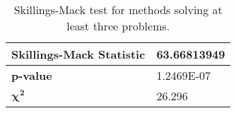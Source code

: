 \begin{table}[h]
\begin{center}
\begin{tabular}{ | P{3.0cm} | P{3.0cm} | }
    \hline
    
    \rule{0pt}{3ex}    
    \textbf{Skillings-Mack Statistic} & 63.66813949 \\[1em]

    \hline

    \rule{0pt}{3ex}    
    \textbf{p-value} & 1.2469E-07 \\[1em]

    \hline

    \rule{0pt}{3ex}    
    $\bm{\chi^2}$ & 26.296 \\[1em]

    \hline

    \end{tabular}
    \end{center}
    \vspace*{-4mm}
    \caption{Skillings-Mack test for methods solving at least three problems. \\[1em]}
    \label{tab:SkillMack_3}
\end{table}